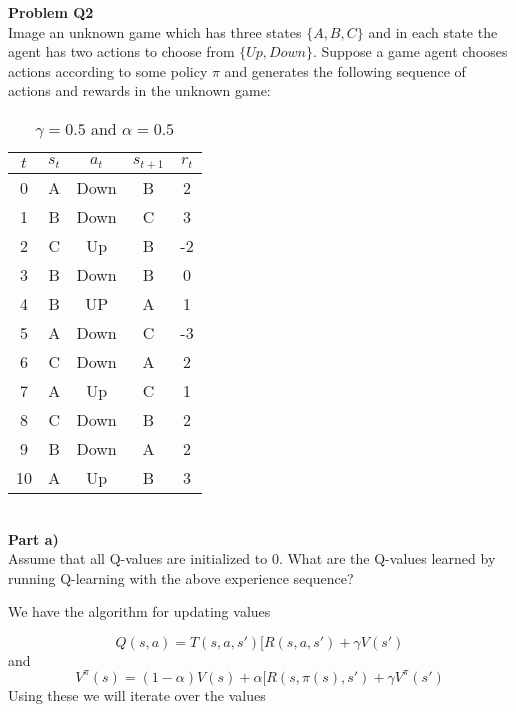 \documentclass[12pt,letter]{article}
\newcommand{\problem}[1]{\vspace{3mm}\Large\textbf{{Problem {#1}\vspace{3mm}}}\normalsize\\}
\newcommand{\ppart}[1]{\vspace{2mm}\large\textbf{\\Part {#1})\vspace{2mm}}\normalsize\\}
\begin{document}
\problem{Q2}
Image an unknown game which has three states $\{A,B,C\}$ and in each state the
agent has two actions to choose from $\{Up,Down\}$. Suppose a game agent chooses
actions according to some policy $\pi$ and generates the following sequence of
actions and rewards in the unknown game:

\begin{table}[h]
\centering
\begin{tabular}{|c|c|c|c|c|}
    \hline
    $t$ & $s_t$ & $a_t$ & $s_{t+1}$ & $r_t$\\
    \hline
    0 & A & Down & B & 2\\\hline
    1 & B & Down & C & 3\\\hline
    2 & C & Up   & B & -2\\\hline
    3 & B & Down & B & 0\\\hline
    4 & B & UP   & A & 1\\\hline
    5 & A & Down & C & -3\\\hline
    6 & C & Down & A & 2\\\hline
    7 & A & Up   & C & 1\\\hline
    8 & C & Down & B & 2\\\hline
    9 & B & Down & A & 2\\\hline
    10& A & Up   & B & 3\\\hline
\end{tabular}
\caption{$\gamma = 0.5$ and $\alpha = 0.5$}
\end{table}
\ppart{a}
Assume that all Q-values are initialized to 0. What are the Q-values learned by
running Q-learning with the above experience sequence?

We have the algorithm for updating values

\[
    Q(s,a) = T(s,a,s')[R(s,a,s') + \gamma V(s')
\]
and
\[
    V^\pi(s) = (1-\alpha)V(s) + \alpha[R(s,\pi(s),s') + \gamma V^\pi(s')
\]
Using these we will iterate over the values
\end{document}
